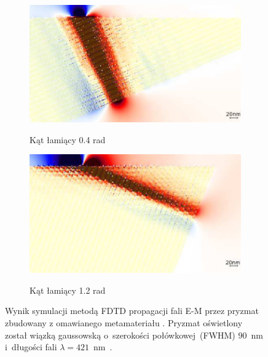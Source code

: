 \begin{figure}[htb]
	\centering
			\begin{subfigure}{0.45\textwidth}
				\includegraphics[width=\textwidth]{images/multilayer/prism04.png} \\
				\caption{Kąt łamiący 0.4 rad}
			\end{subfigure}
			\begin{subfigure}{0.45\textwidth}
				\includegraphics[width=\textwidth]{images/multilayer/prism12.png}\\
				\caption{Kąt łamiący 1.2 rad}
			\end{subfigure}
	\caption{Wynik symulacji metodą FDTD propagacji fali E-M przez pryzmat zbudowany z omawianego metamateriału . Pryzmat oświetlony został wiązką gaussowską o~szerokości połówkowej~(FWHM) $90$~nm i~długości fali $\lambda=421$~nm~\cite{prism2010}.}
\end{figure}

